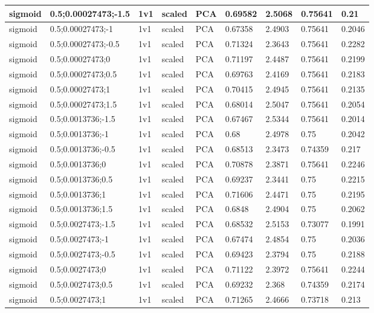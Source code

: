 \begin{longtable}{lllllllll}
sigmoid & 0.5;0.00027473;-1.5 & 1v1 & scaled & PCA & 0.69582 & 2.5068 & 0.75641 & 0.21\\ \hline
sigmoid & 0.5;0.00027473;-1 & 1v1 & scaled & PCA & 0.67358 & 2.4903 & 0.75641 & 0.2046\\ \hline
sigmoid & 0.5;0.00027473;-0.5 & 1v1 & scaled & PCA & 0.71324 & 2.3643 & 0.75641 & 0.2282\\ \hline
sigmoid & 0.5;0.00027473;0 & 1v1 & scaled & PCA & 0.71197 & 2.4487 & 0.75641 & 0.2199\\ \hline
sigmoid & 0.5;0.00027473;0.5 & 1v1 & scaled & PCA & 0.69763 & 2.4169 & 0.75641 & 0.2183\\ \hline
sigmoid & 0.5;0.00027473;1 & 1v1 & scaled & PCA & 0.70415 & 2.4945 & 0.75641 & 0.2135\\ \hline
sigmoid & 0.5;0.00027473;1.5 & 1v1 & scaled & PCA & 0.68014 & 2.5047 & 0.75641 & 0.2054\\ \hline
sigmoid & 0.5;0.0013736;-1.5 & 1v1 & scaled & PCA & 0.67467 & 2.5344 & 0.75641 & 0.2014\\ \hline
sigmoid & 0.5;0.0013736;-1 & 1v1 & scaled & PCA & 0.68 & 2.4978 & 0.75 & 0.2042\\ \hline
sigmoid & 0.5;0.0013736;-0.5 & 1v1 & scaled & PCA & 0.68513 & 2.3473 & 0.74359 & 0.217\\ \hline
sigmoid & 0.5;0.0013736;0 & 1v1 & scaled & PCA & 0.70878 & 2.3871 & 0.75641 & 0.2246\\ \hline
sigmoid & 0.5;0.0013736;0.5 & 1v1 & scaled & PCA & 0.69237 & 2.3441 & 0.75 & 0.2215\\ \hline
sigmoid & 0.5;0.0013736;1 & 1v1 & scaled & PCA & 0.71606 & 2.4471 & 0.75 & 0.2195\\ \hline
sigmoid & 0.5;0.0013736;1.5 & 1v1 & scaled & PCA & 0.6848 & 2.4904 & 0.75 & 0.2062\\ \hline
sigmoid & 0.5;0.0027473;-1.5 & 1v1 & scaled & PCA & 0.68532 & 2.5153 & 0.73077 & 0.1991\\ \hline
sigmoid & 0.5;0.0027473;-1 & 1v1 & scaled & PCA & 0.67474 & 2.4854 & 0.75 & 0.2036\\ \hline
sigmoid & 0.5;0.0027473;-0.5 & 1v1 & scaled & PCA & 0.69423 & 2.3794 & 0.75 & 0.2188\\ \hline
sigmoid & 0.5;0.0027473;0 & 1v1 & scaled & PCA & 0.71122 & 2.3972 & 0.75641 & 0.2244\\ \hline
sigmoid & 0.5;0.0027473;0.5 & 1v1 & scaled & PCA & 0.69232 & 2.368 & 0.74359 & 0.2174\\ \hline
sigmoid & 0.5;0.0027473;1 & 1v1 & scaled & PCA & 0.71265 & 2.4666 & 0.73718 & 0.213\\ \hline

\end{longtable}
